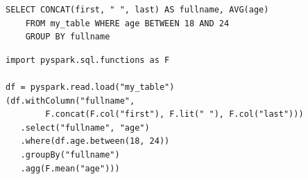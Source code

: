 \documentclass[aspectratio=169]{beamer}
\begin{document}





\begin{frame}[fragile]{}
\small
\begin{verbatim}
SELECT CONCAT(first, " ", last) AS fullname, AVG(age)
    FROM my_table WHERE age BETWEEN 18 AND 24
    GROUP BY fullname
\end{verbatim}

\begin{verbatim}
import pyspark.sql.functions as F

df = pyspark.read.load("my_table")
(df.withColumn("fullname",
        F.concat(F.col("first"), F.lit(" "), F.col("last")))
   .select("fullname", "age")
   .where(df.age.between(18, 24))
   .groupBy("fullname")
   .agg(F.mean("age")))
\end{verbatim}

\end{frame}
\end{document}
